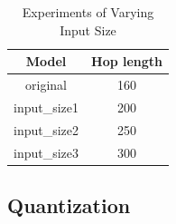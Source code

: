 \documentclass[11pt]{article}
\begin{document}
\begin{table}
\centering
\small
\begin{tabular}{cc}
\toprule  
\textbf{Model} & \textbf{Hop length}\\
\midrule 
original & 160\\
input\_size1 & 200\\
input\_size2 & 250\\
input\_size3 & 300\\
\bottomrule
\end{tabular}
\caption{Experiments of Varying Input Size}
\label{tab:vary_input_size}
\end{table}


\subsection{Quantization}
\end{document}
